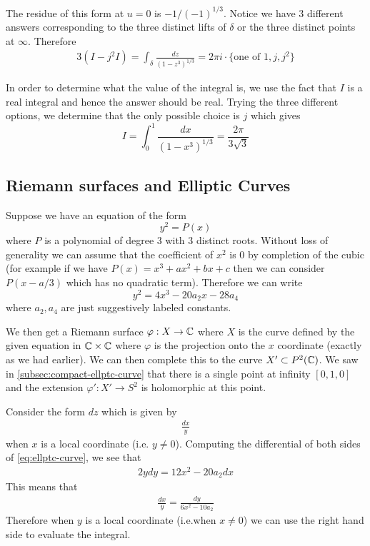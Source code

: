 The residue of this form at $u = 0$ is $-1/(-1)^{1/3}$. Notice we have 3 different answers corresponding to the three distinct lifts of $\delta$ or the three distinct points at $\infty$. Therefore 
\begin{align*}
    3(I - j^2I) = \int_{\delta} \frac{dz}{(1 - z^3)^{1/3}} = 2\pi i \cdot \{\text{one of } 1, j, j^2\}
\end{align*}

In order to determine what the value of the integral is, we use the fact that $I$ is a real integral and hence the answer should be real. Trying the three different options, we determine that the only possible choice is $j$ which gives 
$$ I = \int_{0}^1 \frac{dx}{(1 - x^3)^{1/3}} = \frac{2\pi}{3 \sqrt{3}} $$



\subsection{Riemann surfaces and Elliptic Curves}
Suppose we have an equation of the form 
$$y^2 = P(x)$$
where $P$ is a polynomial of degree 3 with 3 distinct roots. Without loss of generality we can assume that the coefficient of $x^2$ is 0 by completion of the cubic (for example if we have $P(x) = x^3 + ax^2 + bx + c$ then we can consider $P(x - a/3)$ which has no quadratic term). Therefore we can write
\begin{equation}\label{eq:ellptc-curve}
    y^2 = 4x^3 - 20a_2x - 28a_4
\end{equation}
where $a_2, a_4$ are just suggestively labeled constants. 

We then get a Riemann surface $\varphi: X \to \mathbb{C}$ where $X$ is the curve defined by the given equation in $\mathbb{C} \times \mathbb{C}$ where $\varphi$ is the projection onto the $x$ coordinate (exactly as we had earlier). We can then complete this to the curve $X' \subset P^2(\mathbb{C})$. We saw in \autoref{subsec:compact-ellptc-curve} that there is a single point at infinity $[0, 1, 0]$ and the extension $\varphi': X' \to S^2$ is holomorphic at this point.

Consider the form $dz$ which is given by 
\begin{align*}
    \frac{dx}{y}
\end{align*}
when $x$ is a local coordinate (i.e. $y \neq 0$). Computing the differential of both sides of \eqref{eq:ellptc-curve}, we see that 
\begin{align*}
    2ydy = 12x^2 - 20 a_2 dx 
\end{align*}
This means that 
\begin{align*}
    \frac{dx}{y} = \frac{dy}{6x^2 - 10 a_2}
\end{align*}
Therefore when $y$ is a local coordinate (i.e.when $x \neq 0$) we can use the right hand side to evaluate the integral. 

